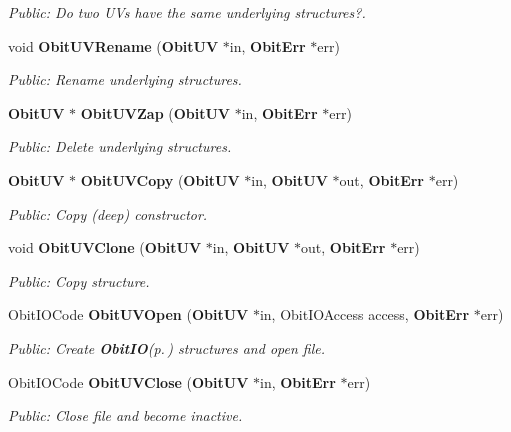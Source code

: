 \begin{CompactItemize}
\begin{CompactList}\small\item\em Public: Do two UVs have the same underlying structures?. \item\end{CompactList}\item 
void {\bf Obit\-UVRename} ({\bf Obit\-UV} $\ast$in, {\bf Obit\-Err} $\ast$err)
\begin{CompactList}\small\item\em Public: Rename underlying structures. \item\end{CompactList}\item 
{\bf Obit\-UV} $\ast$ {\bf Obit\-UVZap} ({\bf Obit\-UV} $\ast$in, {\bf Obit\-Err} $\ast$err)
\begin{CompactList}\small\item\em Public: Delete underlying structures. \item\end{CompactList}\item 
{\bf Obit\-UV} $\ast$ {\bf Obit\-UVCopy} ({\bf Obit\-UV} $\ast$in, {\bf Obit\-UV} $\ast$out, {\bf Obit\-Err} $\ast$err)
\begin{CompactList}\small\item\em Public: Copy (deep) constructor. \item\end{CompactList}\item 
void {\bf Obit\-UVClone} ({\bf Obit\-UV} $\ast$in, {\bf Obit\-UV} $\ast$out, {\bf Obit\-Err} $\ast$err)
\begin{CompactList}\small\item\em Public: Copy structure. \item\end{CompactList}\item 
Obit\-IOCode {\bf Obit\-UVOpen} ({\bf Obit\-UV} $\ast$in, Obit\-IOAccess access, {\bf Obit\-Err} $\ast$err)
\begin{CompactList}\small\item\em Public: Create {\bf Obit\-IO}{\rm (p.\,\pageref{structObitIO})} structures and open file. \item\end{CompactList}\item 
Obit\-IOCode {\bf Obit\-UVClose} ({\bf Obit\-UV} $\ast$in, {\bf Obit\-Err} $\ast$err)
\begin{CompactList}\small\item\em Public: Close file and become inactive. \item\end{CompactList}\item 

\end{CompactItemize}
